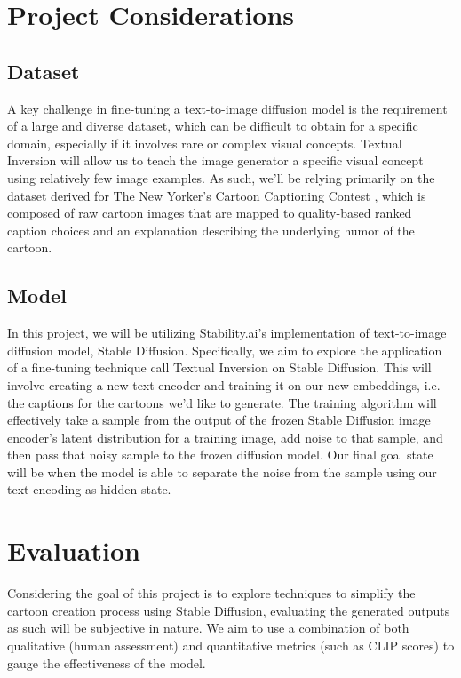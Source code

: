 \documentclass[letterpaper]{article} %
\begin{document}
\section{Project Considerations}

\subsection{Dataset}
A key challenge in fine-tuning a text-to-image diffusion model is the requirement of a large and diverse dataset, which can be difficult to obtain for a specific domain, especially if it involves rare or complex visual concepts. Textual Inversion will allow us to teach the image generator a specific visual concept using relatively few image examples. As such, we'll be relying primarily on the dataset derived for The New Yorker's Cartoon Captioning Contest \cite{hessel2022androids}, which is composed of raw cartoon images that are mapped to quality-based ranked caption choices and an explanation describing the underlying humor of the cartoon.

\subsection{Model}

In this project, we will be utilizing Stability.ai's implementation of text-to-image diffusion model, Stable Diffusion. Specifically, we aim to explore the application of a fine-tuning technique call Textual Inversion on Stable Diffusion. This will involve creating a new text encoder and training it on our new embeddings, i.e. the captions for the cartoons we'd like to generate. The training algorithm will effectively take a sample from the output of the frozen Stable Diffusion image encoder's latent distribution for a training image, add noise to that sample, and then pass that noisy sample to the frozen diffusion model. Our final goal state will be when the model is able to separate the noise from the sample using our text encoding as hidden state.


\section{Evaluation}

Considering the goal of this project is to explore techniques to simplify the cartoon creation process using Stable Diffusion, evaluating the generated outputs as such will be subjective in nature. We aim to use a combination of both qualitative (human assessment) and quantitative metrics (such as CLIP scores) to gauge the effectiveness of the model.


\end{document}
